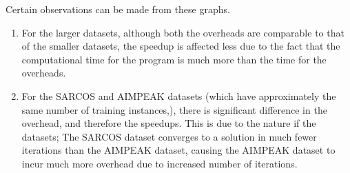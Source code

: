 \documentclass[12pt]{article}
\begin{document}
\newline\newline
Certain observations can be made from these graphs.
\begin{enumerate}[label=(\alph*)]
\item For the larger datasets, although both the overheads are comparable to that of the smaller datasets, the speedup is affected less due to the fact that the computational time for the program is much more than the time for the overheads.
\item For the SARCOS and AIMPEAK datasets (which have approximately the same number of training instances,), there is significant difference in the overhead, and therefore the speedups. This is due to the nature if the datasets; The SARCOS dataset converges to a solution in much fewer iterations than the AIMPEAK dataset, causing the AIMPEAK dataset to incur much more overhead due to increased number of iterations.
\end{enumerate}
\end{document}
